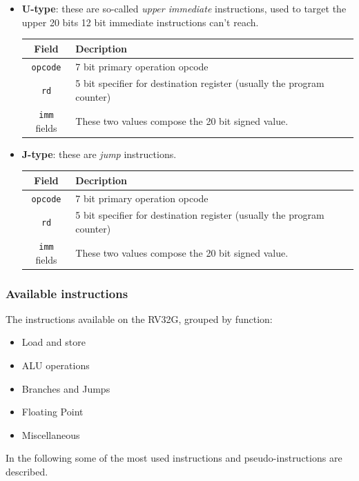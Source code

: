 \documentclass[a4paper,11pt]{article}
\begin{document}
\begin{itemize}
	\item \textbf{U-type}: these are so-called \textit{upper immediate} instructions, used to target the upper 20 bits 12 bit immediate instructions can't reach.
	      \begin{table}[H]
		      \center
		      \begin{tabular} { c | p{12cm} }
			      \bfseries Field     & \bfseries Decription                                                   \\
			      \hline
			      \texttt{opcode}     & 7 bit primary operation opcode                                         \\
			      \texttt{rd}         & 5 bit specifier for destination register (usually the program counter) \\
			      \texttt{imm} fields & These two values compose the 20 bit signed value.                      \\
		      \end{tabular}
	      \end{table}

	\item \textbf{J-type}: these are \textit{jump} instructions.
	      \begin{table}[H]
		      \center
		      \begin{tabular} { c | p{12cm} }
			      \bfseries Field     & \bfseries Decription                                                   \\
			      \hline
			      \texttt{opcode}     & 7 bit primary operation opcode                                         \\
			      \texttt{rd}         & 5 bit specifier for destination register (usually the program counter) \\
			      \texttt{imm} fields & These two values compose the 20 bit signed value.                      \\
		      \end{tabular}
	      \end{table}
\end{itemize}

\subsubsection{Available instructions}

The instructions available on the RV32G, grouped by function:
\begin{itemize}
	\item Load and store
	\item ALU operations
	\item Branches and Jumps
	\item Floating Point
	\item Miscellaneous
\end{itemize}
In the following some of the most used instructions and pseudo-instructions are described.
\end{document}
